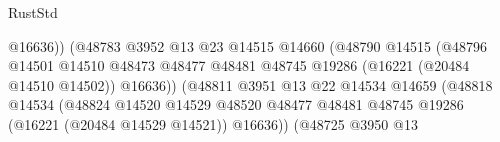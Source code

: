 \begin{lexlean}{RustStd}
\begin{coremodule}
                                                        @16636))
                                                    (@48783
                                                      @3952
                                                      @13
                                                      @23
                                                      @14515
                                                      @14660
                                                      (@48790
                                                        @14515
                                                        (@48796
                                                          @14501
                                                          @14510
                                                          @48473
                                                          @48477
                                                          @48481
                                                          @48745
                                                          @19286
                                                          (@16221 (@20484 @14510 @14502))
                                                          @16636))
                                                      (@48811
                                                        @3951
                                                        @13
                                                        @22
                                                        @14534
                                                        @14659
                                                        (@48818
                                                          @14534
                                                          (@48824
                                                            @14520
                                                            @14529
                                                            @48520
                                                            @48477
                                                            @48481
                                                            @48745
                                                            @19286
                                                            (@16221 (@20484 @14529 @14521))
                                                            @16636))
                                                        (@48725
                                                          @3950
                                                          @13

\end{coremodule}
\end{lexlean}
